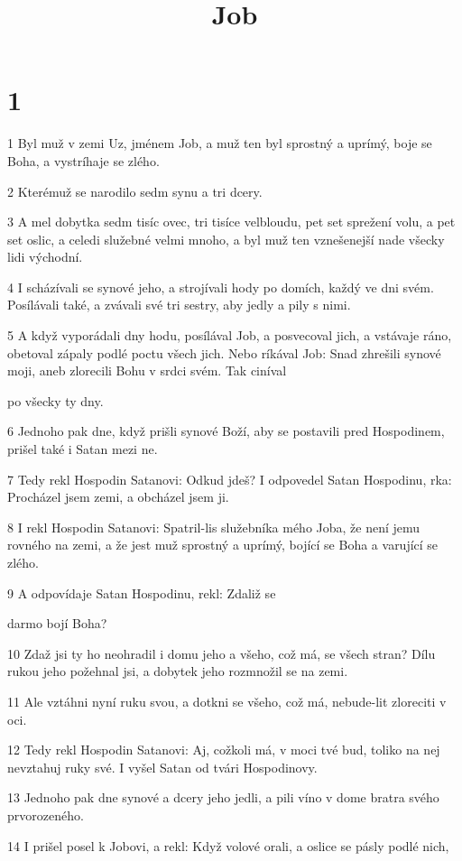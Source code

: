 

\title{Job}

\chapter{1}

\par 1 Byl muž v zemi Uz, jménem Job, a muž ten byl sprostný a uprímý, boje se Boha, a vystríhaje se zlého.
\par 2 Kterémuž se narodilo sedm synu a tri dcery.
\par 3 A mel dobytka sedm tisíc ovec, tri tisíce velbloudu, pet set sprežení volu, a pet set oslic, a celedi služebné velmi mnoho, a byl muž ten vznešenejší nade všecky lidi východní.
\par 4 I scházívali se synové jeho, a strojívali hody po domích, každý ve dni svém. Posílávali také, a zvávali své tri sestry, aby jedly a pily s nimi.
\par 5 A když vyporádali dny hodu, posílával Job, a posvecoval jich, a vstávaje ráno, obetoval zápaly podlé poctu všech jich. Nebo ríkával Job: Snad zhrešili synové moji, aneb zlorecili Bohu v srdci svém. Tak ciníval \par po všecky ty dny.
\par 6 Jednoho pak dne, když prišli synové Boží, aby se postavili pred Hospodinem, prišel také i Satan mezi ne.
\par 7 Tedy rekl Hospodin Satanovi: Odkud jdeš? I odpovedel Satan Hospodinu, rka: Procházel jsem zemi, a obcházel jsem ji.
\par 8 I rekl Hospodin Satanovi: Spatril-lis služebníka mého Joba, že není jemu rovného na zemi, a že jest muž sprostný a uprímý, bojící se Boha a varující se zlého.
\par 9 A odpovídaje Satan Hospodinu, rekl: Zdaliž se \par darmo bojí Boha?
\par 10 Zdaž jsi ty ho neohradil i domu jeho a všeho, což má, se všech stran? Dílu rukou jeho požehnal jsi, a dobytek jeho rozmnožil se na zemi.
\par 11 Ale vztáhni nyní ruku svou, a dotkni se všeho, což má, nebude-lit zloreciti v oci.
\par 12 Tedy rekl Hospodin Satanovi: Aj, cožkoli má, v moci tvé bud, toliko na nej nevztahuj ruky své. I vyšel Satan od tvári Hospodinovy.
\par 13 Jednoho pak dne synové a dcery jeho jedli, a pili víno v dome bratra svého prvorozeného.
\par 14 I prišel posel k Jobovi, a rekl: Když volové orali, a oslice se pásly podlé nich,

